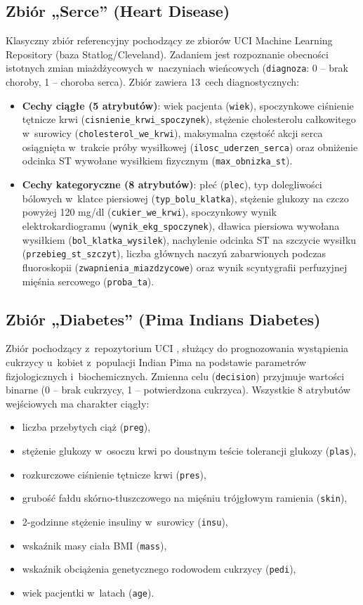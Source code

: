 \subsection{Zbiór „Serce” (Heart Disease)}
Klasyczny zbiór referencyjny pochodzący ze zbiorów UCI Machine Learning Repository \cite{DuaGraff2017} (baza Statlog/Cleveland). Zadaniem jest rozpoznanie obecności istotnych zmian miażdżycowych w~naczyniach wieńcowych (\texttt{diagnoza}: 0 – brak choroby, 1 – choroba serca). Zbiór zawiera 13~cech diagnostycznych:
\begin{itemize}
    \item \textbf{Cechy ciągłe (5 atrybutów)}: wiek pacjenta (\texttt{wiek}), spoczynkowe ciśnienie tętnicze krwi (\texttt{cisnienie\_krwi\_spoczynek}), stężenie cholesterolu całkowitego w~surowicy (\texttt{cholesterol\_we\_krwi}), maksymalna częstość akcji serca osiągnięta w~trakcie próby wysiłkowej (\texttt{ilosc\_uderzen\_serca}) oraz obniżenie odcinka ST wywołane wysiłkiem fizycznym (\texttt{max\_obnizka\_st}).
    \item \textbf{Cechy kategoryczne (8 atrybutów)}: płeć (\texttt{plec}), typ dolegliwości bólowych w~klatce piersiowej (\texttt{typ\_bolu\_klatka}), stężenie glukozy na czczo powyżej 120 mg/dl (\texttt{cukier\_we\_krwi}), spoczynkowy wynik elektrokardiogramu (\texttt{wynik\_ekg\_spoczynek}), dławica piersiowa wywołana wysiłkiem (\texttt{bol\_klatka\_wysilek}), nachylenie odcinka ST na szczycie wysiłku (\texttt{przebieg\_st\_szczyt}), liczba głównych naczyń zabarwionych podczas fluoroskopii (\texttt{zwapnienia\_miazdzycowe}) oraz wynik scyntygrafii perfuzyjnej mięśnia sercowego (\texttt{proba\_ta}).
\end{itemize}

\subsection{Zbiór „Diabetes” (Pima Indians Diabetes)}
Zbiór pochodzący z~repozytorium UCI \cite{DuaGraff2017}, służący do prognozowania wystąpienia cukrzycy u~kobiet z~populacji Indian Pima na podstawie parametrów fizjologicznych i~biochemicznych. Zmienna celu (\texttt{decision}) przyjmuje wartości binarne (0 – brak cukrzycy, 1 – potwierdzona cukrzyca). Wszystkie 8 atrybutów wejściowych ma charakter ciągły:
\begin{itemize}
    \item liczba przebytych ciąż (\texttt{preg}),
    \item stężenie glukozy w~osoczu krwi po doustnym teście tolerancji glukozy (\texttt{plas}),
    \item rozkurczowe ciśnienie tętnicze krwi (\texttt{pres}),
    \item grubość fałdu skórno-tłuszczowego na mięśniu trójgłowym ramienia (\texttt{skin}),
    \item 2-godzinne stężenie insuliny w~surowicy (\texttt{insu}),
    \item wskaźnik masy ciała BMI (\texttt{mass}),
    \item wskaźnik obciążenia genetycznego rodowodem cukrzycy (\texttt{pedi}),
    \item wiek pacjentki w~latach (\texttt{age}).
\end{itemize}

